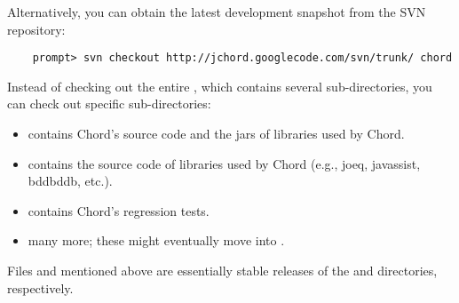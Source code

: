 Alternatively, you can obtain the latest development snapshot from the SVN repository:

\begin{verbatim}
    prompt> svn checkout http://jchord.googlecode.com/svn/trunk/ chord
\end{verbatim}

Instead of checking out the entire , which contains several sub-directories, you can check out
specific sub-directories:
\begin{itemize}
\item {} contains Chord's source code and the jars of libraries used by Chord.
\item {} contains the source code of libraries used by Chord (e.g., joeq, javassist, bddbddb, etc.).
\item {} contains Chord's regression tests.
\item many more; these might eventually move into .
\end{itemize}

Files  and  mentioned above are essentially stable releases of
the  and  directories, respectively. 

